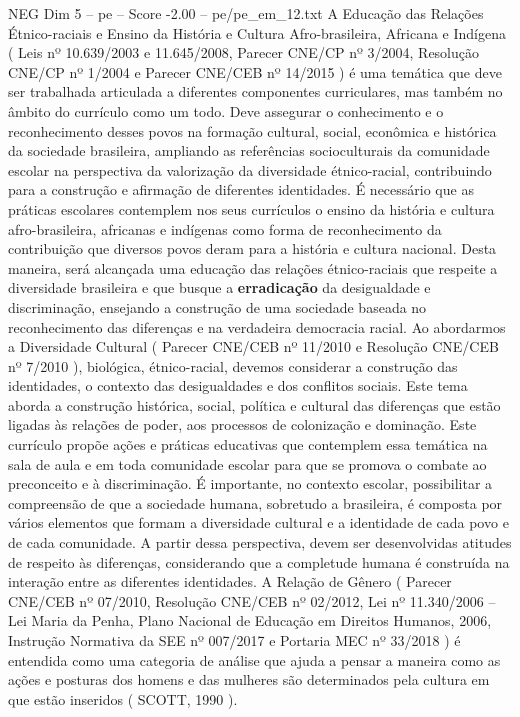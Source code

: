 \begin{textsample}{NEG Dim 5 – pe – Score -2.00 – pe/pe\_em\_12.txt}
A Educação das Relações Étnico-raciais e Ensino da História e Cultura Afro-brasileira, Africana e Indígena ( Leis nº 10.639/2003 e 11.645/2008, Parecer CNE/CP nº 3/2004, Resolução CNE/CP nº 1/2004 e Parecer CNE/CEB nº 14/2015 ) é uma temática que deve ser trabalhada articulada a diferentes componentes curriculares, mas também no âmbito do currículo como um todo.
Deve assegurar o conhecimento e o reconhecimento desses povos na formação cultural, social, econômica e histórica da sociedade brasileira, ampliando as referências socioculturais da comunidade escolar na perspectiva da valorização da diversidade étnico-racial, contribuindo para a construção e afirmação de diferentes identidades.
É necessário que as práticas escolares contemplem nos seus currículos o ensino da história e cultura afro-brasileira, africanas e indígenas como forma de reconhecimento da contribuição que diversos povos deram para a história e cultura nacional.
Desta maneira, será alcançada uma educação das relações étnico-raciais que respeite a diversidade brasileira e que busque a \textbf{erradicação} da desigualdade e discriminação, ensejando a construção de uma sociedade baseada no reconhecimento das diferenças e na verdadeira democracia racial.
Ao abordarmos a Diversidade Cultural ( Parecer CNE/CEB nº 11/2010 e Resolução CNE/CEB nº 7/2010 ), biológica, étnico-racial, devemos considerar a construção das identidades, o contexto das desigualdades e dos conflitos sociais.
Este tema aborda a construção histórica, social, política e cultural das diferenças que estão ligadas às relações de poder, aos processos de colonização e dominação.
Este currículo propõe ações e práticas educativas que contemplem essa temática na sala de aula e em toda comunidade escolar para que se promova o combate ao preconceito e à discriminação.
É importante, no contexto escolar, possibilitar a compreensão de que a sociedade humana, sobretudo a brasileira, é composta por vários elementos que formam a diversidade cultural e a identidade de cada povo e de cada comunidade.
A partir dessa perspectiva, devem ser desenvolvidas atitudes de respeito às diferenças, considerando que a completude humana é construída na interação entre as diferentes identidades.
A Relação de Gênero ( Parecer CNE/CEB nº 07/2010, Resolução CNE/CEB nº 02/2012, Lei nº 11.340/2006 – Lei Maria da Penha, Plano Nacional de Educação em Direitos Humanos, 2006, Instrução Normativa da SEE nº 007/2017 e Portaria MEC nº 33/2018 ) é entendida como uma categoria de análise que ajuda a pensar a maneira como as ações e posturas dos homens e das mulheres são determinados pela cultura em que estão inseridos ( SCOTT, 1990 ).

\end{textsample}
